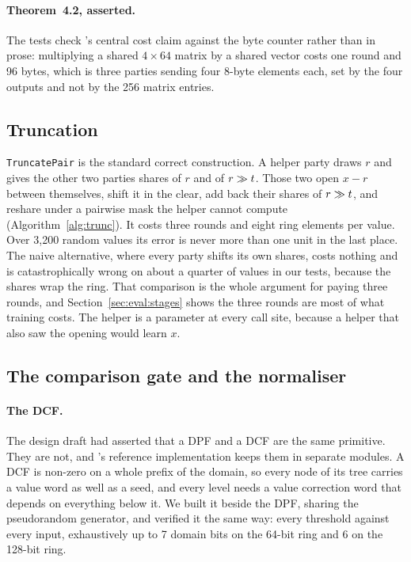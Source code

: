 \paragraph{Theorem~4.2, asserted.} The tests check \nudgeplain{}'s central cost
claim against the byte counter rather than in prose: multiplying a shared
$4 \times 64$ matrix by a shared vector costs one round and 96 bytes, which is
three parties sending four 8-byte elements each, set by the four outputs and not
by the 256 matrix entries.

\subsection{Truncation}
\label{sec:impl:trunc}

\texttt{TruncatePair} is the standard correct construction. A helper party draws
$r$ and gives the other two parties shares of $r$ and of $r \gg t$. Those
two open $x - r$ between themselves, shift it in the clear, add back their shares
of $r \gg t$, and reshare under a pairwise mask the helper cannot
compute (Algorithm~\ref{alg:trunc}). It costs three rounds and eight ring elements
per value. Over 3{,}200 random values its error is
never more than one unit in the last place. The naive alternative, where every
party shifts its own shares, costs nothing and is catastrophically wrong on about
a quarter of values in our tests, because the shares wrap the ring. That
comparison is the whole argument for paying three rounds, and
Section~\ref{sec:eval:stages} shows the three rounds are most of what training
costs. The helper is a parameter at every call site, because a helper that also
saw the opening would learn $x$.

\subsection{The comparison gate and the normaliser}
\label{sec:impl:norm}

\paragraph{The DCF.} The design draft had asserted that a DPF and a DCF are the
same primitive. They are not, and \nudgeplain{}'s reference implementation keeps
them in separate modules. A DCF is non-zero on a whole prefix of the domain, so
every node of its tree carries a value word as well as a seed, and every level
needs a value correction word that depends on everything below it. We built it
beside the DPF, sharing the pseudorandom generator, and verified it the same
way: every threshold against every input, exhaustively up to 7 domain bits on the
64-bit ring and 6 on the 128-bit ring.

